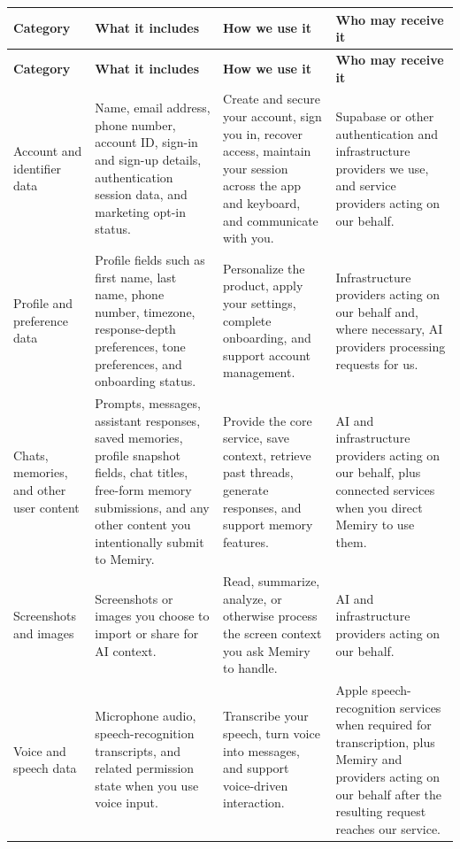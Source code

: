 \documentclass[11pt]{article}
\begin{document}
\small
\begin{longtable}{L{0.19\textwidth} L{0.28\textwidth} L{0.25\textwidth} L{0.2\textwidth}}
\toprule
\textbf{Category} & \textbf{What it includes} & \textbf{How we use it} & \textbf{Who may receive it} \\
\midrule
\endfirsthead
\toprule
\textbf{Category} & \textbf{What it includes} & \textbf{How we use it} & \textbf{Who may receive it} \\
\midrule
\endhead
\bottomrule
\endfoot
Account and identifier data &
Name, email address, phone number, account ID, sign-in and sign-up details, authentication session data, and marketing opt-in status. &
Create and secure your account, sign you in, recover access, maintain your session across the app and keyboard, and communicate with you. &
Supabase or other authentication and infrastructure providers we use, and service providers acting on our behalf. \\

Profile and preference data &
Profile fields such as first name, last name, phone number, timezone, response-depth preferences, tone preferences, and onboarding status. &
Personalize the product, apply your settings, complete onboarding, and support account management. &
Infrastructure providers acting on our behalf and, where necessary, AI providers processing requests for us. \\

Chats, memories, and other user content &
Prompts, messages, assistant responses, saved memories, profile snapshot fields, chat titles, free-form memory submissions, and any other content you intentionally submit to Memiry. &
Provide the core service, save context, retrieve past threads, generate responses, and support memory features. &
AI and infrastructure providers acting on our behalf, plus connected services when you direct Memiry to use them. \\

Screenshots and images &
Screenshots or images you choose to import or share for AI context. &
Read, summarize, analyze, or otherwise process the screen context you ask Memiry to handle. &
AI and infrastructure providers acting on our behalf. \\

Voice and speech data &
Microphone audio, speech-recognition transcripts, and related permission state when you use voice input. &
Transcribe your speech, turn voice into messages, and support voice-driven interaction. &
Apple speech-recognition services when required for transcription, plus Memiry and providers acting on our behalf after the resulting request reaches our service. \\


\end{longtable}
\end{document}
